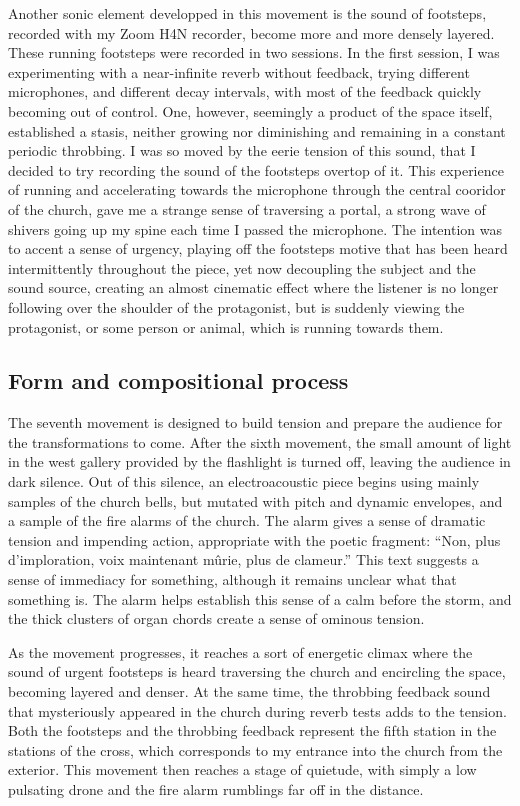 \documentclass[12pt,twoside,maitrise]{dms_ks}
\theoremstyle{definition}
\begin{document}
{Another sonic element developped in this movement is the sound of footsteps, recorded with my Zoom H4N recorder, become more and more densely layered. 
These running footsteps were recorded in two sessions. 
In the first session, I was experimenting with a near-infinite reverb without feedback, trying different microphones, and different decay intervals, with most of the feedback quickly becoming out of control. 
One, however, seemingly a product of the space itself, established a stasis, neither growing nor diminishing and remaining in a constant periodic throbbing. 
I was so moved by the eerie tension of this sound, that I decided to try recording the sound of the footsteps overtop of it. 
This experience of running and accelerating towards the microphone through the central cooridor of the church, gave me a strange sense of traversing a portal, a strong wave of shivers going up my spine each time I passed the microphone.
The intention was to accent a sense of urgency, playing off the footsteps motive that has been heard intermittently throughout the piece, yet now decoupling the subject and the sound source, creating an almost cinematic effect where the listener is no longer following over the shoulder of the protagonist, but is suddenly viewing the protagonist, or some person or animal, which is running towards them. 

\subsection{Form and compositional process}

The seventh movement is designed to build tension and prepare the audience for the transformations to come. 
After the sixth movement, the small amount of light in the west gallery provided by the flashlight is turned off, leaving the audience in dark silence. 
Out of this silence, an electroacoustic piece begins using mainly samples of the church bells, but mutated with pitch and dynamic envelopes, and a sample of the fire alarms of the church. 
The alarm gives a sense of dramatic tension and impending action, appropriate with the poetic fragment: “Non, plus d’imploration, voix maintenant mûrie, plus de clameur.” This text suggests a sense of immediacy for something, although it remains unclear what that something is. 
The alarm helps establish this sense of a calm before the storm, and the thick clusters of organ chords create a sense of ominous tension.

As the movement progresses, it reaches a sort of energetic climax where the sound of urgent footsteps is heard traversing the church and encircling the space, becoming layered and denser. 
At the same time, the throbbing feedback sound that mysteriously appeared in the church during reverb tests adds to the tension. 
Both the footsteps and the throbbing feedback represent the fifth station in the stations of the cross, which corresponds to my entrance into the church from the exterior. 
This movement then reaches a stage of quietude, with simply a low pulsating drone and the fire alarm rumblings far off in the distance.

}
\end{document}
